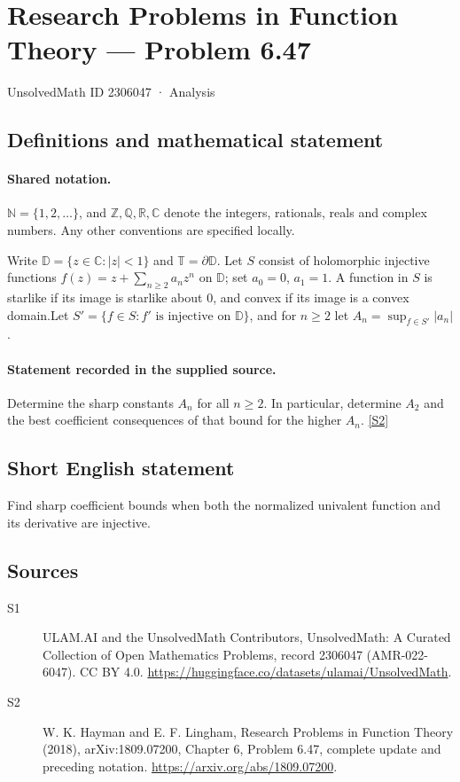 \documentclass[11pt]{article}
\newcommand{\sref}[2]{\hyperlink{source:#1:#2}{[S#2]}}
\begin{document}
\setcounter{section}{2306046}
\section{Research Problems in Function Theory — Problem 6.47}\label{2306047}
{\small\sffamily UnsolvedMath ID 2306047 · Analysis}
\subsection{Definitions and mathematical statement}

\paragraph{Shared notation.}$\mathbb N=\{1,2,\ldots\}$, and $\mathbb Z,\mathbb Q,\mathbb R,\mathbb C$ denote the integers, rationals, reals and complex numbers. Any other conventions are specified locally.


Write $\mathbb D=\{z\in\mathbb C:|z|<1\}$ and $\mathbb T=\partial\mathbb D$. Let $S$ consist of holomorphic injective functions $f(z)=z+\sum_{n\ge2}a_nz^n$ on $\mathbb D$; set $a_0=0$, $a_1=1$. A function in $S$ is starlike if its image is starlike about $0$, and convex if its image is a convex domain.Let $S'=\{f\in S:f'\text{ is injective on }\mathbb D\}$, and for $n\ge2$ let $A_n=\sup_{f\in S'}|a_n|$.
\paragraph{Statement recorded in the supplied source.}
Determine the sharp constants $A_n$ for all $n\ge2$. In particular, determine $A_2$ and the best coefficient consequences of that bound for the higher $A_n$. \sref{2306047}{2}
\subsection{Short English statement}
Find sharp coefficient bounds when both the normalized univalent function and its derivative are injective.
\subsection{Sources}
\begin{description}
\item[\hypertarget{source:2306047:1}{S1}] ULAM.AI and the UnsolvedMath Contributors, UnsolvedMath: A Curated Collection of Open Mathematics Problems, record 2306047 (AMR-022-6047). CC BY 4.0. \url{https://huggingface.co/datasets/ulamai/UnsolvedMath}.
\item[\hypertarget{source:2306047:2}{S2}] W. K. Hayman and E. F. Lingham, Research Problems in Function Theory (2018), arXiv:1809.07200, Chapter 6, Problem 6.47, complete update and preceding notation. \url{https://arxiv.org/abs/1809.07200}.
\end{description}
\label{end:2306047}
\end{document}
